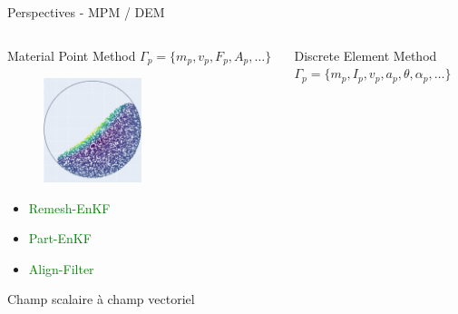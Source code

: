 \documentclass[aspectratio=169]{beamer} %
\newcommand{\cmark}{\ding{51}}%
\begin{document}
\begin{frame}{Perspectives - MPM / DEM}
    \vspace{-0.8cm}
    \begin{columns}[t]
        \begin{column}{0.5\textwidth}
            \small
            \begin{block}{Material Point Method}
                $\Gamma_p = \{m_p, v_p, F_p, A_p,\dots\}$ \\
                \begin{figure}[b]
                    \includegraphics[width =0.5\textwidth]{../../conference/images/rot_drum_part/rot_drum_part-81.png}
                \end{figure}
                \begin{itemize}
                    \item \textcolor{green}{\cmark  Remesh-EnKF}\\
                    \item \textcolor{green}{\cmark  Part-EnKF}\\
                    \item \textcolor{green}{\cmark  Align-Filter}
                \end{itemize}
                Champ scalaire à champ vectoriel
            \end{block}
        \end{column}
        \begin{column}{0.5\textwidth}
            \begin{block}{Discrete Element Method}
                $\Gamma_p = \{m_p, I_p, v_p, a_p, \theta,\alpha_p, \dots\}$ \\
                \begin{figure}

\end{figure}
\end{block}
\end{column}
\end{columns}
\end{frame}
\end{document}
